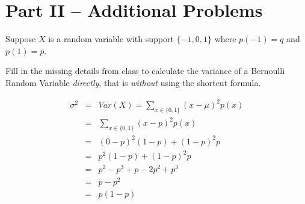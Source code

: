 \documentclass[addpoints,12pt]{exam}
\begin{document}
\section*{Part II -- Additional Problems}
\begin{questions}


\question Suppose $X$ is a random variable with support $\{-1, 0, 1\}$ where $p(-1)=q$ and $p(1) = p$.

\question Fill in the missing details from class to calculate the variance of a Bernoulli Random Variable \emph{directly}, that is \emph{without} using the shortcut formula.
	\begin{solution} 
	\begin{eqnarray*}
	\sigma^2 &=& Var(X) = \sum_{x \in \{0,1\}} (x - \mu)^2 p(x)\\ 
	&=& \sum_{x \in \{0,1\}} (x - p)^2 p(x)\\
	 &=& (0 - p)^2 (1-p) + (1-p)^2 p \\
	 &=& p^2(1-p) + (1-p)^2 p\\ 
	 &=& p^2 - p^3 + p - 2p^2 +p^3 \\
	 &=& p - p^2\\ 
	 &=&p(1-p)
\end{eqnarray*}
	\end{solution}


\end{questions}
\end{document}
